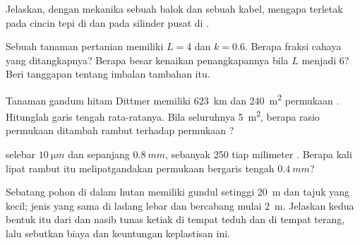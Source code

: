 \begin{exercise}[$\star\star$]\label{exo:b1:flowering-plant-organization:6}
Jelaskan, dengan mekanika sebuah balok dan sebuah kabel, mengapa
 terletak pada cincin tepi di  dan pada
silinder pusat di .
\end{exercise}

\begin{exercise}[$\star\star$]\label{exo:b1:flowering-plant-organization:7}
Sebuah tanaman pertanian memiliki $L = 4$ dan $k = 0.6$. Berapa fraksi
cahaya yang ditangkapnya? Berapa besar kenaikan penangkapannya bila $L$
menjadi 6? Beri tanggapan tentang imbalan  tambahan itu.
\end{exercise}

\begin{exercise}[$\star\star$]\label{exo:b1:flowering-plant-organization:8}
Tanaman gandum hitam Dittmer memiliki \qty{623}{km}  dan
\qty{240}{m^2} permukaan . Hitunglah garis tengah  rata-ratanya.
Bila  seluruhnya \qty{5}{m^2}, berapa rasio permukaan 
ditambah rambut terhadap permukaan ?
\end{exercise}

\begin{exercise}[$\star\star$]\label{exo:b1:flowering-plant-organization:9}
 selebar $\qty{10}{\micro m}$ dan sepanjang $\qty{0.8}{mm}$,
sebanyak \qty{250}{} tiap milimeter . Berapa kali lipat rambut itu
melipatgandakan permukaan  bergaris tengah $\qty{0.4}{mm}$?
\end{exercise}

\begin{exercise}[$\star\star\star$]\label{exo:b1:flowering-plant-organization:10}
Sebatang pohon di dalam hutan memiliki  gundul setinggi
\qty{20}{m} dan tajuk yang kecil; jenis yang sama di ladang lebar dan
bercabang mulai \qty{2}{m}. Jelaskan kedua bentuk itu dari  dan nasib tunas ketiak di tempat teduh dan di tempat terang,
lalu sebutkan biaya dan keuntungan keplastisan ini.
\end{exercise}

